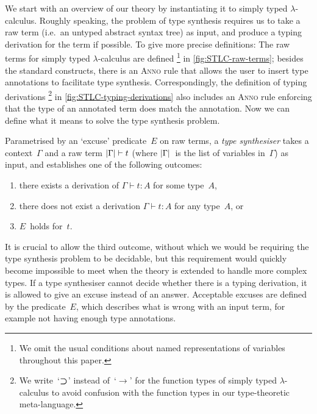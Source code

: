 We start with an overview of our theory by instantiating it to simply typed $\lambda$-calculus.
Roughly speaking, the problem of type synthesis requires us to take a raw term (i.e.~an untyped abstract syntax tree) as input, and produce a typing derivation for the term if possible.
To give more precise definitions:
The raw terms for simply typed $\lambda$-calculus are defined%
\footnote{We omit the usual conditions about named representations of variables throughout this paper.}
in \cref{fig:STLC-raw-terms};
besides the standard constructs, there is an \textsc{Anno} rule that allows the user to insert type annotations to facilitate type synthesis.
Correspondingly, the definition of typing derivations%
\footnote{We write~`$\mathbin{\bm{\supset}}$' instead of~`$\to$' for the function types of simply typed $\lambda$-calculus to avoid confusion with the function types in our type-theoretic meta-language.}
in \cref{fig:STLC-typing-derivations} also includes an \textsc{Anno} rule enforcing that the type of an annotated term does match the annotation.
Now we can define what it means to solve the type synthesis problem.

\begin{definition}
\label{def:STLC-type-synthesiser}
Parametrised by an `excuse' predicate~$E$ on raw terms, a \emph{type synthesiser} takes a context~$\Gamma$ and a raw term $\left|\Gamma\right| \vdash t$ (where $\left|\Gamma\right|$~is the list of variables in~$\Gamma$) as input, and establishes one of the following outcomes:
\begin{enumerate}
\item there exists a derivation of $\Gamma \vdash t : A$ for some type~$A$,
\item there does not exist a derivation $\Gamma \vdash t : A$ for any type~$A$, or
\item $E$~holds for~$t$.
\end{enumerate}
\end{definition}

It is crucial to allow the third outcome, without which we would be requiring the type synthesis problem to be decidable, but this requirement would quickly become impossible to meet when the theory is extended to handle more complex types.
If a type synthesiser cannot decide whether there is a typing derivation, it is allowed to give an excuse instead of an answer.
Acceptable excuses are defined by the predicate~$E$, which describes what is wrong with an input term, for example not having enough type annotations.

